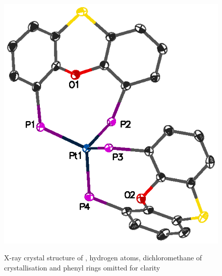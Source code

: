 \begin{figure}[htb]
\begin{center}
\vspace{0.5cm}
\includegraphics[scale=1.1]{../Figures/CrystalPtSPh2phenyl.eps}
\caption[X-ray crystal structure of \ce{[Pt(Ph-thixantphos)2]}]{X-ray crystal structure of \ce{[Pt(Ph-thixantphos)2]}, hydrogen atoms, dichloromethane of crystallisation and phenyl rings omitted for clarity}
\vspace{0.2cm}
\label{crystalbisthixantphosplatinumphenyl}
\end{center}
\end{figure}
\vspace{0.2cm}


